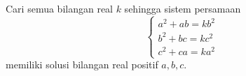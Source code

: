 Cari semua bilangan real \( k \) sehingga sistem persamaan
\[
\begin{cases}
a^2 + ab = kb^2 \\
b^2 + bc = kc^2 \\
c^2 + ca = ka^2
\end{cases}
\]
memiliki solusi bilangan real positif $a, b, c$.